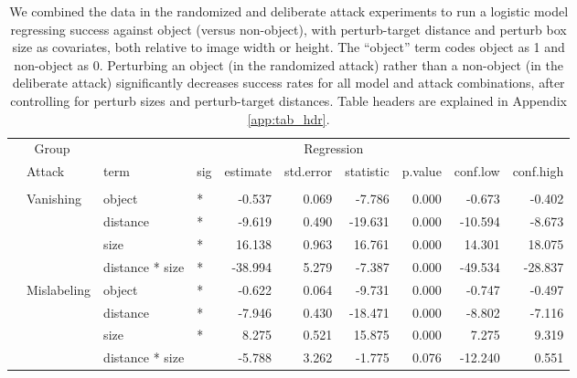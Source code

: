 \begin{longtable}[t]{llllrrrrrr}
\caption{\label{tab:rand_arb_compare_table}We combined the data in the randomized and deliberate attack experiments to run a logistic model regressing success against object (versus non-object), with perturb-target distance and perturb box size as covariates, both relative to image width or height. The ``object'' term codes object as 1 and non-object as 0. Perturbing an object (in the randomized attack) rather than a non-object (in the deliberate attack) significantly decreases success rates for all model and attack combinations, after controlling for perturb sizes and perturb-target distances. Table headers are explained in Appendix \ref{app:tab_hdr}.}\\
\toprule
\multicolumn{2}{c}{Group} & \multicolumn{8}{c}{Regression} \\
\cmidrule(l{3pt}r{3pt}){1-2} \cmidrule(l{3pt}r{3pt}){3-10}
 & Attack & term & sig & estimate & std.error & statistic & p.value & conf.low & conf.high\\
\midrule
\addlinespace[0.3em]
\multicolumn{10}{l}{\textbf{YOLOv3}}\\
\hspace{1em} & Vanishing & object & * & -0.537 & 0.069 & -7.786 & 0.000 & -0.673 & -0.402\\
\cmidrule{3-10}\nopagebreak
\hspace{1em} &  & distance & * & -9.619 & 0.490 & -19.631 & 0.000 & -10.594 & -8.673\\
\cmidrule{3-10}\nopagebreak
\hspace{1em} &  & size & * & 16.138 & 0.963 & 16.761 & 0.000 & 14.301 & 18.075\\
\cmidrule{3-10}\nopagebreak
\hspace{1em} &  & distance * size & * & -38.994 & 5.279 & -7.387 & 0.000 & -49.534 & -28.837\\
\cmidrule{2-10}\nopagebreak
\hspace{1em} & Mislabeling & object & * & -0.622 & 0.064 & -9.731 & 0.000 & -0.747 & -0.497\\
\cmidrule{3-10}\nopagebreak
\hspace{1em} &  & distance & * & -7.946 & 0.430 & -18.471 & 0.000 & -8.802 & -7.116\\
\cmidrule{3-10}\nopagebreak
\hspace{1em} &  & size & * & 8.275 & 0.521 & 15.875 & 0.000 & 7.275 & 9.319\\
\cmidrule{3-10}\nopagebreak
\hspace{1em} &  & distance * size &  & -5.788 & 3.262 & -1.775 & 0.076 & -12.240 & 0.551\\

\end{longtable}
